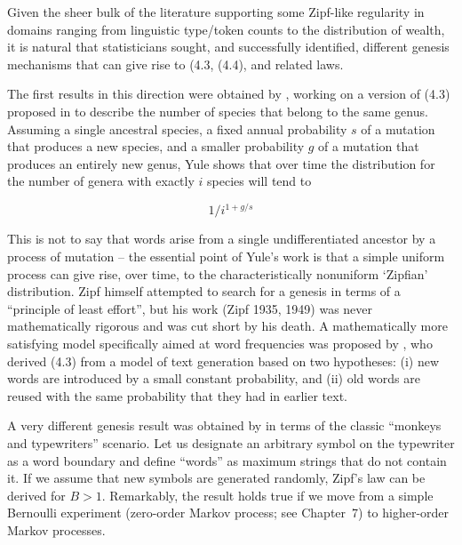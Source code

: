 \noindent
Given the sheer bulk of the literature supporting some Zipf-like regularity in
domains ranging from linguistic type/token counts to the distribution of
wealth, it is natural that statisticians sought, and successfully identified,
different genesis mechanisms that can give rise to (4.3, (4.4), and related
laws.

The first results in this direction were obtained by ,
working on a version of (4.3) proposed in  to describe
the number of species that belong to the same genus. Assuming a single
ancestral species, a fixed annual probability $s$ of a mutation that produces
a new species, and a smaller probability $g$ of a mutation that produces an
entirely new genus, Yule shows that over time the distribution for the number
of genera with exactly $i$ species will tend to

\begin{equation} %
1/i^{1+g/s}
\end{equation}

This is not to say that words arise from a single undifferentiated ancestor by
a process of mutation -- the essential point of Yule's work is that a simple
uniform process can give rise, over time, to the characteristically nonuniform
`Zipfian' distribution. %
%
Zipf himself attempted to search for a genesis in terms of a ``principle of
least effort'', but his work (Zipf 1935, 1949) \nocite{Zipf:1935}
\nocite{Zipf:1949} was never mathematically rigorous and was cut short by his
death. A mathematically more satisfying model specifically aimed at word
frequencies was proposed by , who derived (4.3) from a
model of text generation based on two hypotheses: (i) new words are
introduced by a small constant probability, and (ii) old words are reused
with the same probability that they had in earlier text.

A very different genesis result was obtained by 
in terms of the classic ``monkeys and typewriters'' scenario. Let us designate
an arbitrary symbol on the typewriter as a word boundary and define ``words''
as maximum strings that do not contain it. If we assume that new symbols are
generated randomly, Zipf's law can be derived for $B > 1$. Remarkably, the
result holds true if we move from a simple Bernoulli experiment (zero-order
Markov process; see Chapter~7) to higher-order Markov processes.

